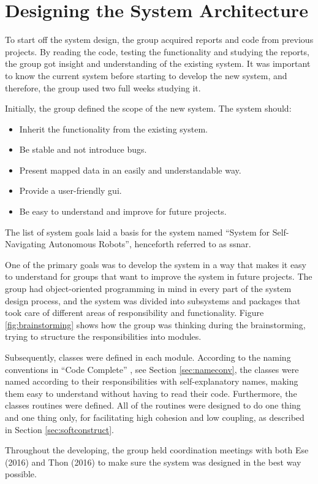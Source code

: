 \section{Designing the System Architecture}
To start off the system design, the group acquired reports and code from previous projects. By reading the code, testing the functionality and studying the reports, the group got insight and understanding of the existing system. It was important to know the current system before starting to develop the new system, and therefore, the group used two full weeks studying it.

Initially, the group defined the scope of the new system. The system should:
\begin{itemize}
    \item Inherit the functionality from the existing system.
    \item Be stable and not introduce bugs.
    \item Present mapped data in an easily and understandable way.
    \item Provide a user-friendly \acrshort{gui}.
    \item Be easy to understand and improve for future projects.
\end{itemize}
The list of system goals laid a basis for the system named ``System for Self-Navigating Autonomous Robots'', henceforth referred to as \acrshort{ssnar}.

One of the primary goals was to develop the system in a way that makes it easy to understand for groups that want to improve the system in future projects. The group had object-oriented programming in mind in every part of the system design process,  and the system was divided into subsystems and packages that took care of different areas of responsibility and functionality. Figure \ref{fig:brainstorming} shows how the group was thinking during the brainstorming, trying to structure the responsibilities into modules. 

Subsequently, classes were defined in each module. According to the naming conventions in ``Code Complete'' \cite{stevemcconnell2004}, see Section \ref{sec:nameconv}, the classes were named according to their responsibilities with self-explanatory names, making them easy to understand without having to read their code. Furthermore, the classes routines were defined. All of the routines were designed to do one thing and one thing only, for facilitating high cohesion and low coupling, as described in Section \ref{sec:softconstruct}.

Throughout the developing, the group held coordination meetings with both Ese (2016) and Thon (2016) to make sure the system was designed in the best way possible.
